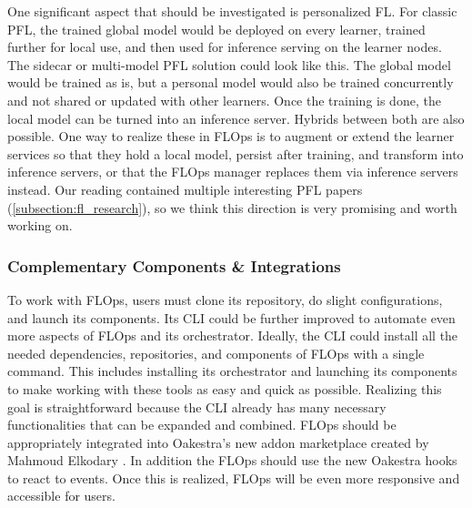 One significant aspect that should be investigated is personalized FL.
For classic PFL, the trained global model would be deployed on every learner, trained further for local use, and then used for inference serving on the learner nodes.
The sidecar or multi-model PFL solution could look like this.
The global model would be trained as is, but a personal model would also be trained concurrently and not shared or updated with other learners.
Once the training is done, the local model can be turned into an inference server.
Hybrids between both are also possible.
One way to realize these in FLOps is to augment or extend the learner services so that they hold a local model, persist after training, and transform into inference servers, or that the FLOps manager replaces them via inference servers instead.
Our reading contained multiple interesting PFL papers (\ref{subsection:fl_research}), so we think this direction is very promising and worth working on.

\subsubsection{Complementary Components \& Integrations}
To work with FLOps, users must clone its repository, do slight configurations, and launch its components.
Its CLI could be further improved to automate even more aspects of FLOps and its orchestrator.
Ideally, the CLI could install all the needed dependencies, repositories, and components of FLOps with a single command.
This includes installing its orchestrator and launching its components to make working with these tools as easy and quick as possible.
Realizing this goal is straightforward because the CLI already has many necessary functionalities that can be expanded and combined.
FLOps should be appropriately integrated into Oakestra's new addon marketplace created by Mahmoud Elkodary \cite{thesis:tum_mahmoud}.
In addition the FLOps should use the new Oakestra hooks to react to events.
Once this is realized, FLOps will be even more responsive and accessible for users.

